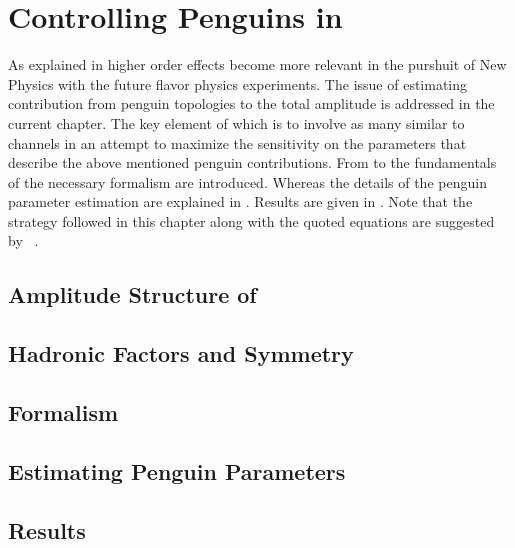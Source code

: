 
\chapter{Controlling Penguins in \phis}
\label{Penguins}

As explained in  higher order effects become more relevant in the purshuit
of New Physics with the future flavor physics experiments. The issue of estimating contribution from penguin topologies
to the total \BsJpsiPhi amplitude is addressed in the current chapter. The key element of which
is to involve as many similar to \BsJpsiPhi channels in an attempt to maximize the sensitivity on
the parameters that describe the above mentioned penguin contributions. From 
to  the fundamentals of the necessary formalism are introduced.
Whereas the details of the penguin parameter estimation are explained in .
Results are given in . Note that the strategy followed in this chapter
along with the quoted equations are suggested by ~\cite{Fleischer:1999zi,Faller:2008gt,DeBruyn:2014oga}.

\section{Amplitude Structure of \BsJpsiPhi}
\label{jpsiphi_amp_struct}


\section{Hadronic Factors and \grpsuthree Symmetry}
\label{had_pars_suthree}


\section{Formalism}
\label{penguin_formalism}


\section{Estimating Penguin Parameters}
\label{penguin_more_chanells}


\section{Results}
\label{penguin_results}

